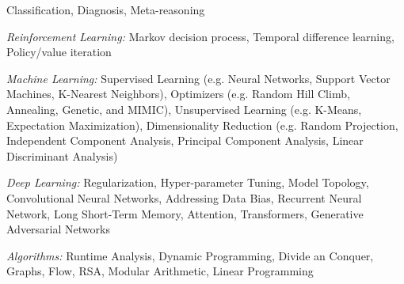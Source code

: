 \documentclass[11pt]{res}%
\begin{document}
\begin{resume}
\begin{adjustwidth}{0.05\textwidth}{0.0\textwidth}
\begin{description}
\begin{description}
Classification, 
Diagnosis, 
Meta{-}reasoning
\item{\textit{Reinforcement Learning:}}
Markov decision process, 
Temporal difference learning, 
Policy/value iteration
\item{\textit{Machine Learning:}}
Supervised Learning (e.g. Neural Networks, 
Support Vector Machines, 
K{-}Nearest Neighbors), 
Optimizers (e.g. Random Hill Climb, 
Annealing, 
Genetic, 
and MIMIC), 
Unsupervised Learning (e.g. K{-}Means, 
Expectation Maximization), 
Dimensionality Reduction (e.g. Random Projection, 
Independent Component Analysis, 
Principal Component Analysis, 
Linear Discriminant Analysis) 
\item{\textit{Deep Learning:}}
Regularization, 
Hyper{-}parameter Tuning, 
Model Topology, 
Convolutional Neural Networks, 
Addressing Data Bias, 
Recurrent Neural Network, 
Long Short{-}Term Memory, 
Attention, 
Transformers, 
Generative Adversarial Networks
\item{\textit{Algorithms:}}
Runtime Analysis, 
Dynamic Programming, 
Divide an Conquer, 
Graphs, 
Flow, 
RSA, 
Modular Arithmetic, 
Linear Programming
\end{description}
\end{description}
\end{adjustwidth}


\end{resume}%
\end{document}

